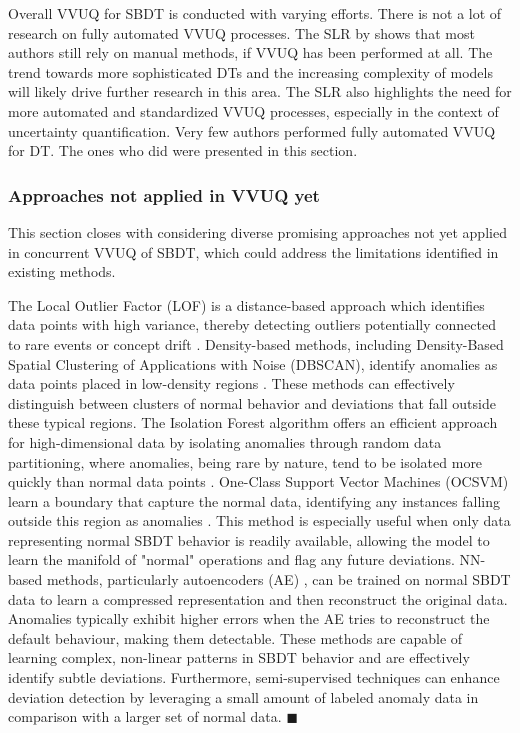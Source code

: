 Overall VVUQ for SBDT is conducted with varying efforts. There is not a lot of research on fully automated VVUQ processes. The SLR by \autocite{Bitencourt2023} shows that most authors still rely on manual methods, if VVUQ has been performed at all. The trend towards more sophisticated DTs and the increasing complexity of models will likely drive further research in this area. The SLR also highlights the need for more automated and standardized VVUQ processes, especially in the context of uncertainty quantification. Very few authors performed fully automated VVUQ for DT. The ones who did were presented in this section.

\subsubsection*{Approaches not applied in VVUQ yet}
\label{sec:promising-future-directions}
This section closes with considering diverse promising approaches not yet applied in concurrent VVUQ of SBDT, which could address the limitations identified in existing methods.

The Local Outlier Factor (LOF) is a distance-based approach which identifies data points with high variance, thereby detecting outliers potentially connected to rare events or concept drift \autocite{alghushairy2020review}. Density-based methods, including Density-Based Spatial Clustering of Applications with Noise (DBSCAN), identify anomalies as data points placed in low-density regions \autocite{ccelik2011anomaly}. These methods can effectively distinguish between clusters of normal behavior and deviations that fall outside these typical regions.
The Isolation Forest algorithm offers an efficient approach for high-dimensional data by isolating anomalies through random data partitioning, where anomalies, being rare by nature, tend to be isolated more quickly than normal data points \autocite{xu2017improved}.
One-Class Support Vector Machines (OCSVM) learn a boundary that capture the normal data, identifying any instances falling outside this region as anomalies \autocite{li2003improving}. This method is especially useful when only data representing normal SBDT behavior is readily available, allowing the model to learn the manifold of "normal" operations and flag any future deviations. NN-based methods, particularly autoencoders (AE) \autocite{zhou2017anomaly}, can be trained on normal SBDT data to learn a compressed representation and then reconstruct the original data. Anomalies typically exhibit higher errors when the AE tries to reconstruct the default behaviour, making them detectable. These methods are capable of learning complex, non-linear patterns in SBDT behavior and are effectively identify subtle deviations. Furthermore, semi-supervised techniques can enhance deviation detection by leveraging a small amount of labeled anomaly data in comparison with a larger set of normal data. \(\blacksquare\)

